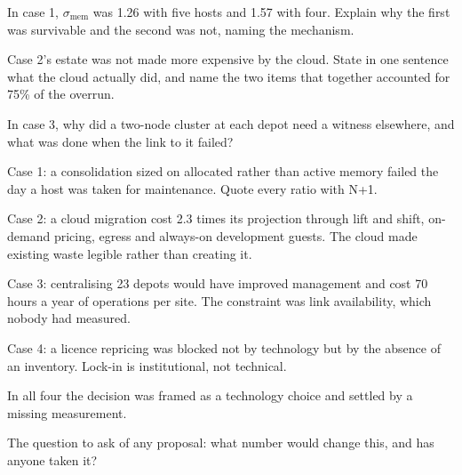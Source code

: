 \begin{checkpoint}
\begin{tightnum}
  \item In case 1, $\sigma_{\text{mem}}$ was 1.26 with five hosts and 1.57 with
        four. Explain why the first was survivable and the second was not,
        naming the mechanism.
  \item Case 2's estate was not made more expensive by the cloud. State in one
        sentence what the cloud actually did, and name the two items that
        together accounted for 75\% of the overrun.
  \item In case 3, why did a two-node cluster at each depot need a witness
        elsewhere, and what was done when the link to it failed?
\end{tightnum}
\end{checkpoint}

\begin{chaptersummary}
\begin{tight}
  \item Case 1: a consolidation sized on allocated rather than active memory
        failed the day a host was taken for maintenance. Quote every ratio with
        N+1.
  \item Case 2: a cloud migration cost 2.3 times its projection through lift
        and shift, on-demand pricing, egress and always-on development guests.
        The cloud made existing waste legible rather than creating it.
  \item Case 3: centralising 23 depots would have improved management and cost
        70 hours a year of operations per site. The constraint was link
        availability, which nobody had measured.
  \item Case 4: a licence repricing was blocked not by technology but by the
        absence of an inventory. Lock-in is institutional, not technical.
  \item In all four the decision was framed as a technology choice and settled
        by a missing measurement.
  \item The question to ask of any proposal: what number would change this, and
        has anyone taken it?
\end{tight}
\end{chaptersummary}

